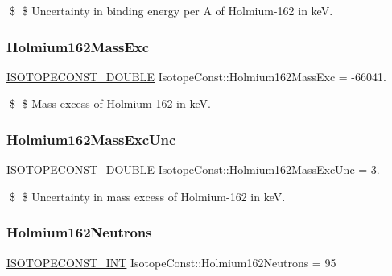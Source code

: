 \$ \$ Uncertainty in binding energy per A of Holmium-\/162 in keV. \mbox{\label{group___isotope_const-_holmium-_ho162_ga2e2c7cc536c84fe8b903e67c0681825d}} 
\subsubsection{\texorpdfstring{Holmium162\+Mass\+Exc}{Holmium162MassExc}}
{\footnotesize\ttfamily \mbox{\hyperlink{group___isotope_const-_macros_ga8f45a7272ce02c0b4c65c44636ed719a}{I\+S\+O\+T\+O\+P\+E\+C\+O\+N\+S\+T\+\_\+\+D\+O\+U\+B\+LE}} Isotope\+Const\+::\+Holmium162\+Mass\+Exc = -\/66041.}

\$ \$ Mass excess of Holmium-\/162 in keV. \mbox{\label{group___isotope_const-_holmium-_ho162_gae395df2378aa68a8f8669104416e4e26}} 
\subsubsection{\texorpdfstring{Holmium162\+Mass\+Exc\+Unc}{Holmium162MassExcUnc}}
{\footnotesize\ttfamily \mbox{\hyperlink{group___isotope_const-_macros_ga8f45a7272ce02c0b4c65c44636ed719a}{I\+S\+O\+T\+O\+P\+E\+C\+O\+N\+S\+T\+\_\+\+D\+O\+U\+B\+LE}} Isotope\+Const\+::\+Holmium162\+Mass\+Exc\+Unc = 3.}

\$ \$ Uncertainty in mass excess of Holmium-\/162 in keV. \mbox{\label{group___isotope_const-_holmium-_ho162_gaeda2babc0533576dd97e81556ee5caa9}} 
\subsubsection{\texorpdfstring{Holmium162\+Neutrons}{Holmium162Neutrons}}
{\footnotesize\ttfamily \mbox{\hyperlink{group___isotope_const-_macros_ga5f18360b3e99483a35c32d789e62621c}{I\+S\+O\+T\+O\+P\+E\+C\+O\+N\+S\+T\+\_\+\+I\+NT}} Isotope\+Const\+::\+Holmium162\+Neutrons = 95}

